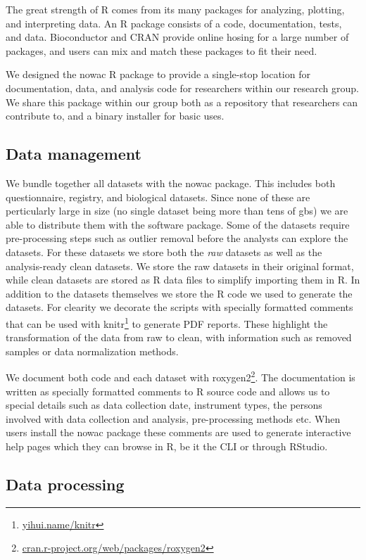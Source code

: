 The great strength of R comes from its many packages for analyzing, plotting,
and interpreting data. An R package consists of a code, documentation, tests,
and data. Bioconductor and CRAN provide online hosing for a large number of
packages, and users can mix and match these packages to fit their need. 

We designed the \gls{nowac} R package to provide a single-stop location for
documentation, data, and analysis code for researchers within our research
group. We share this package within our group both as a repository that
researchers can contribute to, and a binary installer for basic uses. 

\subsection{Data management} 
We bundle together all datasets with the \gls{nowac} package. This includes both
questionnaire, registry, and biological datasets. Since none of these are
perticularly large in size (no single dataset being more than tens of
\glspl{gb}) we are able to distribute them with the software package. Some of
the datasets require pre-processing steps such as outlier removal before the
analysts can explore the datasets. For these datasets we store both the
\emph{raw} datasets as well as the analysis-ready clean datasets. We store the
raw datasets in their original format, while clean datasets are stored as R data
files to simplify importing them in R. In addition to the datasets themselves we
store the R code we used to generate the datasets. For clearity we decorate the
scripts with specially formatted comments that can be used with
knitr\footnote{\url{yihui.name/knitr}} to generate PDF reports. These highlight
the transformation of the data from raw to clean, with information such as
removed samples or data normalization methods. 

We document both code and each dataset with
roxygen2\footnote{\url{cran.r-project.org/web/packages/roxygen2}}. The
documentation is written as specially formatted comments to R source code and
allows us to special details such as data collection date, instrument types, the
persons involved with data collection and analysis, pre-processing methods etc.
When users install the \gls{nowac} package these comments are used to generate
interactive help pages which they can browse in R, be it the CLI or through
RStudio. 

\subsection{Data processing} 

